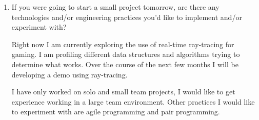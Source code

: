 \documentclass[10pts,a4paper]{article}
\begin{document}
\begin{enumerate}
\item If you were going to start a small project tomorrow, are there any technologies and/or engineering practices you'd like to implement and/or experiment with?

Right now I am currently exploring the use of real-time ray-tracing for gaming.  I am profiling different data structures and algorithms trying to determine what works.  Over the course of the next few months I will be developing a demo using ray-tracing.

I have only worked on solo and small team projects, I would like to get experience working in a large team environment.  Other practices I would like to experiment with are agile programming and pair programming.
 

\end{enumerate}
\end{document}
